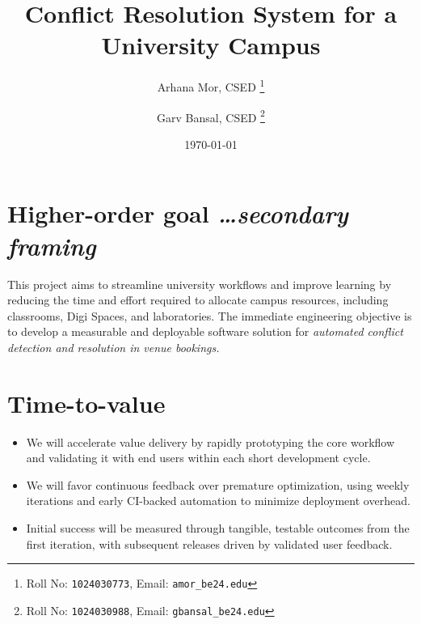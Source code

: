 \documentclass[11pt,a4paper]{article}
\title{Conflict Resolution System for a University Campus}
\author{
  Arhana Mor, CSED%
  \thanks{Roll No: \texttt{1024030773}, %
    Email: \texttt{amor\_be24\@thapar.edu}}
  \and 
  Garv Bansal, CSED%
  \thanks{Roll No: \texttt{1024030988}, %
    Email: \texttt{gbansal\_be24\@thapar.edu}}
}
\date{\today}
\newcommand{\BvrHint}[1]{%
  {\normalfont\normalsize\itshape\hfill #1}}
\begin{document}
\maketitle

\section{Higher-order goal%
  \BvrHint{\ldots secondary framing}}
This project aims to streamline university workflows and improve learning by reducing the time and effort required to allocate campus resources, including classrooms, Digi Spaces, and laboratories. The immediate engineering objective is to develop a measurable and deployable software solution for 
 \emph{automated conflict detection and resolution in venue bookings.} 

\section{Time-to-value }
\begin{itemize}[leftmargin=0.7cm]
    \item We will accelerate value delivery by rapidly prototyping the core workflow and validating it with end users within each short development cycle.
    \item We will favor continuous feedback over premature optimization, using weekly iterations and early CI-backed automation to minimize deployment overhead.
    \item Initial success will be measured through tangible, testable outcomes from the first iteration, with subsequent releases driven by validated user feedback.
\end{itemize}
\end{document}
